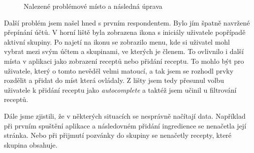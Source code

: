 \begin{figure}[H]
    \centering
    \hfill
    \caption{Nalezené problémové místo a následná úprava}
\end{figure}

Další problém jsem našel hned s prvním respondentem. Bylo jím špatně navržené přepínání účtů. V horní liště byla zobrazena ikona s iniciály uživatele
popřípadě aktivní skupiny. Po najetí na ikonu se zobrazilo menu, kde si uživatel mohl vybrat mezi svým účtem a skupinami, ve kterých je členem. To
ovlivnilo i další místa v aplikaci jako zobrazení receptů nebo přidání receptu. To mohlo být pro uživatele, který o tomto nevěděl velmi matoucí, a
tak jsem se rozhodl prvky rozdělit a přidat do míst která ovládaly. Z lišty jsem tedy přesunul volbu uživatele k přidání receptu jako \emph{autocomplete}
a taktéž jsem učinil u filtrování receptů.

Dále jsme zjistili, že v některých situacích se nesprávně načítají data. Například při prvním spuštění aplikace a následovném přidání ingredience
se nenačetla její stránka. Nebo při přijmutí pozvánky do skupiny se nenačetly recepty, které skupina obsahuje.

